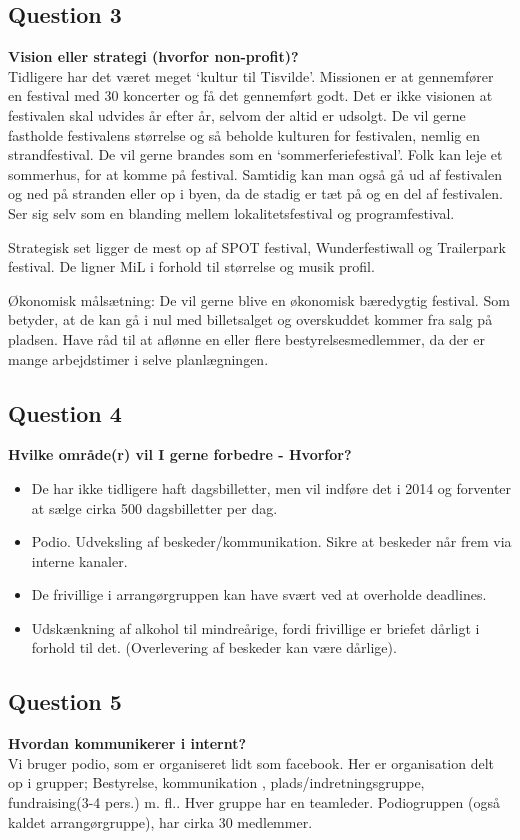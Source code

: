 \subsection{Question 3}
\label{i1q3}
\noindent \textbf{Vision eller strategi (hvorfor non-profit)?} \\
Tidligere har det været meget ‘kultur til Tisvilde’. Missionen er at gennemfører en festival med 30 koncerter og få det gennemført godt. Det er ikke visionen at festivalen skal udvides år efter år, selvom der altid er udsolgt. De vil gerne fastholde festivalens størrelse og så beholde kulturen for festivalen, nemlig en strandfestival. De vil gerne brandes som en ‘sommerferiefestival’. Folk kan leje et sommerhus, for at komme på festival. Samtidig kan man også gå ud af festivalen og ned på stranden eller op i byen, da de stadig er tæt på og en del af festivalen. Ser sig selv som en blanding mellem lokalitetsfestival og programfestival. 

Strategisk set ligger de mest op af SPOT festival, Wunderfestiwall og Trailerpark festival. De ligner MiL i forhold til størrelse og musik profil.

Økonomisk målsætning: De vil gerne blive en økonomisk bæredygtig festival. Som betyder, at de kan gå i nul med billetsalget og overskuddet kommer fra salg på pladsen. Have råd til at aflønne en eller flere bestyrelsesmedlemmer, da der er mange arbejdstimer i selve planlægningen.

\subsection{Question 4}
\label{i1q4}
\noindent \textbf{Hvilke område(r) vil I gerne forbedre - Hvorfor?} \\
\begin{itemize}
	\item De har ikke tidligere haft dagsbilletter, men vil indføre det i 2014 og forventer at sælge cirka 500 dagsbilletter per dag. 
	\item Podio. Udveksling af beskeder/kommunikation. Sikre at beskeder når frem via interne kanaler. 
	\item De frivillige i arrangørgruppen kan have svært ved at overholde deadlines. 
	\item Udskænkning af alkohol til mindreårige, fordi frivillige er briefet dårligt i forhold til det. (Overlevering af beskeder kan være dårlige).
\end{itemize}

\subsection{Question 5}
\label{i1q5}
\noindent \textbf{Hvordan kommunikerer i internt?} \\
Vi bruger podio, som er organiseret lidt som facebook. Her er organisation delt op i grupper; Bestyrelse, kommunikation , plads/indretningsgruppe, fundraising(3-4 pers.) m. fl.. Hver gruppe har en teamleder. Podiogruppen (også kaldet arrangørgruppe), har cirka 30 medlemmer. 

